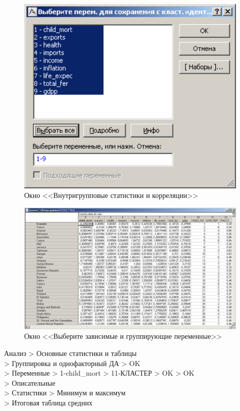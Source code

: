 \begin{figure}[!h]
\begin{minipage}{0.49\textwidth}
    \includegraphics[width=0.99\textwidth]
    {inc/cars_my/var5__3_2.PNG}

    \caption{Окно <<Внутригрупповые статистики и корреляции>>}
    \label{fig:var5__3_2}
  \end{minipage}
\end{figure}

\begin{figure}[!h]
  \centering

  \includegraphics[width=0.99\textwidth]
  {inc/cars_my/var5__3_3.PNG}

  \caption{Окно <<Выберите зависимые и группирующие переменные>>}
  \label{fig:var5__3_3}
\end{figure}

\newpage

Анализ > Основные статистики и таблицы\\
> Группировка и однофакторный ДА > OK\\
> Переменные > 1-child\_mort > 11-КЛАСТЕР > OK > OK\\
> Описательные\\
> Статистики > Минимум и максимум\\
> Итоговая таблица средних

